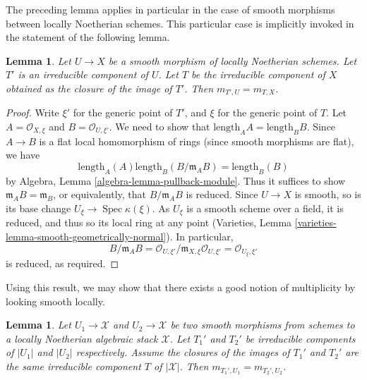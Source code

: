 \documentclass{stacks-project}
\theoremstyle{plain}
\newtheorem{lemma}[subsection]{Lemma}
\theoremstyle{definition}
\theoremstyle{remark}
\numberwithin{equation}{subsection}
\def\Spec{\mathop{\mathrm{Spec}}}
\begin{document}
\noindent
The preceding lemma applies in particular in the case of smooth morphisms
between locally Noetherian schemes. This particular case is
implicitly invoked in the statement of the following lemma.

\begin{lemma}
\label{lemma-multiplicities}
Let $U \to X$ be a smooth morphism of locally Noetherian schemes.
Let $T'$ is an irreducible component of $U$. Let $T$ be the
irreducible component of $X$ obtained as the closure of the
image of $T'$. Then $m_{T', U} = m_{T, X}$.
\end{lemma}

\begin{proof}
Write $\xi'$ for the generic point of $T'$, and $\xi$ for the
generic point of $T$. Let $A = \mathcal{O}_{X, \xi}$ and
$B = \mathcal{O}_{U, \xi'}$. We need to show that
$\text{length}_A A = \text{length}_B B$. Since
$A \to B$ is a flat local homomorphism of rings
(since smooth morphisms are flat), we have
$$
\text{length}_A(A) \text{length}_B(B/\mathfrak m_A B) =
\text{length}_B(B)
$$
by Algebra, Lemma \ref{algebra-lemma-pullback-module}. Thus it suffices
to show $\mathfrak m_A B = \mathfrak m_B$, or equivalently, that
$B/\mathfrak m_A B$ is reduced. Since $U \to X$ is smooth,
so is its base change $U_{\xi} \to \Spec \kappa(\xi)$. As $U_{\xi}$ is a
smooth scheme over a field, it is reduced, and thus so its local ring
at any point
(Varieties, Lemma \ref{varieties-lemma-smooth-geometrically-normal}).
In particular,
$$
B/\mathfrak m_A B =
\mathcal{O}_{U, \xi'}/\mathfrak m_{X, \xi}\mathcal{O}_{U, \xi'} =
\mathcal{O}_{U_\xi, \xi'}
$$
is reduced, as required.
\end{proof}

\noindent
Using this result, we may show that there exists a good notion
of multiplicity by looking smooth locally.

\begin{lemma}
\label{lemma-multiplicity}
Let $U_1 \to \mathcal{X}$ and $U_2 \to \mathcal{X}$ be two smooth
morphisms from schemes to a locally Noetherian algebraic stack $\mathcal{X}$.
Let $T_1'$ and $T_2'$ be irreducible components of $|U_1|$
and $|U_2|$ respectively. Assume the closures of the images of
$T_1'$ and $T_2'$ are the same irreducible component $T$ of $|\mathcal{X}|$.
Then $m_{T_1', U_1} = m_{T_2', U_2}$.
\end{lemma}
\end{document}
